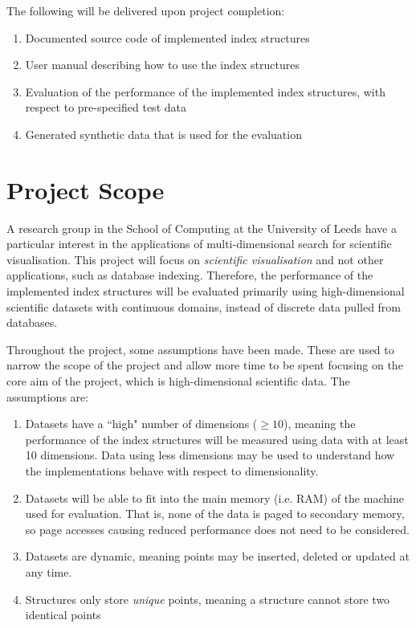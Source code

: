 The following will be delivered upon project completion:
\begin{enumerate}
	\item Documented source code of implemented index structures
	\item User manual describing how to use the index structures
	\item Evaluation of the performance of the implemented index structures, with respect to pre-specified test data
	\item Generated synthetic data that is used for the evaluation
\end{enumerate}

\newpage

\section{Project Scope}
\label{sec:core-assumptions}

A research group in the School of Computing at the University of Leeds have a particular interest in the applications of multi-dimensional search for scientific visualisation. This project will focus on \textit{scientific visualisation} and not other applications, such as database indexing. Therefore, the performance of the implemented index structures will be evaluated primarily using high-dimensional scientific datasets with continuous domains, instead of discrete data pulled from databases.

Throughout the project, some assumptions have been made. These are used to narrow the scope of the project and allow more time to be spent focusing on the core aim of the project, which is high-dimensional scientific data. The assumptions are:
\begin{enumerate}
	\item Datasets have a ``high" number of dimensions ($\geq 10$), meaning the performance of the index structures will be measured using data with at least 10 dimensions. Data using less dimensions may be used to understand how the implementations behave with respect to dimensionality.
	\item Datasets will be able to fit into the main memory (i.e. RAM) of the machine used for evaluation. That is, none of the data is paged to secondary memory, so page accesses causing reduced performance does not need to be considered.
	\item Datasets are dynamic, meaning points may be inserted, deleted or updated at any time.
	\item Structures only store \textit{unique} points, meaning a structure cannot store two identical points
\end{enumerate}

